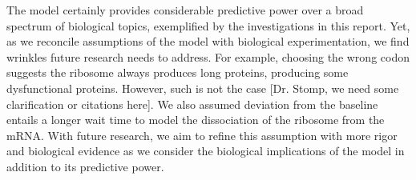 \documentclass[12pt, draft]{article}
\numberwithin{equation}{section}
\begin{document}

The model certainly provides considerable predictive power over a broad spectrum
of biological topics, exemplified by the investigations in this report.  Yet,
as we reconcile assumptions of the model with biological
experimentation, we find wrinkles future research needs to address.
For example, choosing the wrong codon suggests the ribosome always produces
long proteins, producing some dysfunctional proteins. However, such is not the case
[Dr. Stomp, we need some clarification or citations here]. We also
assumed deviation from the baseline entails a longer wait time to
model the dissociation of the ribosome from the mRNA. With future
research, we aim to refine this assumption with more rigor and
biological evidence as we consider the biological implications of the model in addition
to its predictive power.

{}
\begin{singlespace}  \end{singlespace}
\end{document}
